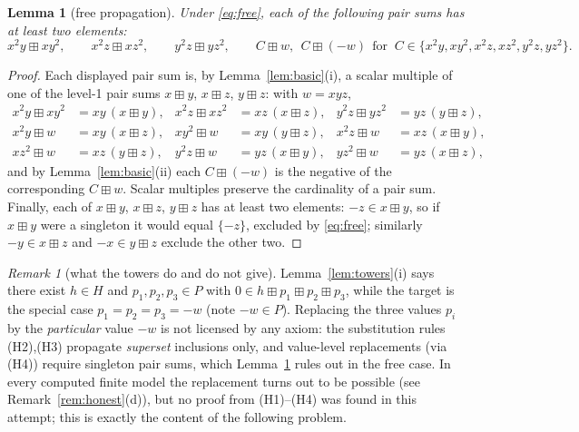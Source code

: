 \documentclass[11pt]{article}
\newtheorem{lemma}[theorem]{Lemma}
\theoremstyle{definition}
\theoremstyle{remark}
\newtheorem{remark}[theorem]{Remark}
\newcommand{\bp}{\boxplus}
\begin{document}
\begin{lemma}[free propagation]\label{lem:prop}
Under \eqref{eq:free}, each of the following pair sums has at least two
elements:
\[
  x^2y\bp xy^2,\qquad x^2z\bp xz^2,\qquad y^2z\bp yz^2,\qquad
  C\bp w,\ \ C\bp(-w)\ \ \text{for }\ 
  C\in\{x^2y,xy^2,x^2z,xz^2,y^2z,yz^2\}.
\]
\end{lemma}

\begin{proof}
Each displayed pair sum is, by Lemma~\ref{lem:basic}(i), a scalar multiple
of one of the level-1 pair sums $x\bp y$, $x\bp z$, $y\bp z$: with
$w=xyz$,
\begin{align*}
  x^2y\bp xy^2&=xy\,(x\bp y), &
  x^2z\bp xz^2&=xz\,(x\bp z), &
  y^2z\bp yz^2&=yz\,(y\bp z),\\
  x^2y\bp w&=xy\,(x\bp z), &
  xy^2\bp w&=xy\,(y\bp z), &
  x^2z\bp w&=xz\,(x\bp y),\\
  xz^2\bp w&=xz\,(y\bp z), &
  y^2z\bp w&=yz\,(x\bp y), &
  yz^2\bp w&=yz\,(x\bp z),
\end{align*}
and by Lemma~\ref{lem:basic}(ii) each $C\bp(-w)$ is the negative of the
corresponding $C\bp w$. Scalar multiples preserve the cardinality of a
pair sum. Finally, each of $x\bp y$, $x\bp z$, $y\bp z$ has at least two
elements: $-z\in x\bp y$, so if $x\bp y$ were a singleton it would equal
$\{-z\}$, excluded by \eqref{eq:free}; similarly
$-y\in x\bp z$ and $-x\in y\bp z$ exclude the other two.
\end{proof}

\begin{remark}[what the towers do and do not give]\label{rem:gap}
Lemma~\ref{lem:towers}(i) says there exist $h\in H$ and
$p_1,p_2,p_3\in P$ with $0\in h\bp p_1\bp p_2\bp p_3$, while the target
is the special case $p_1=p_2=p_3=-w$ (note $-w\in P$). Replacing the
three values $p_i$ by the \emph{particular} value $-w$ is not licensed by
any axiom: the substitution rules (H2),(H3) propagate \emph{superset}
inclusions only, and value-level replacements (via (H4)) require
singleton pair sums, which Lemma~\ref{lem:prop} rules out in the free
case. In every computed finite model the replacement turns out to be
possible (see Remark~\ref{rem:honest}(d)), but no proof from (H1)--(H4)
was found in this attempt; this is exactly the content of the following
problem.
\end{remark}
\end{document}
